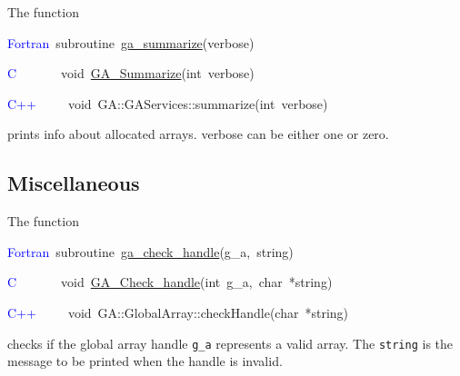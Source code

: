 The function
\begin{lyxcode}
\textcolor{blue}{Fortran}~subroutine~\href{http://www.emsl.pnl.gov/docs/global/ga_ops.html\#ga_summarize}{ga\_{}summarize}(verbose)~

\textcolor{blue}{C~}~~~~~~void~\href{http://www.emsl.pnl.gov/docs/global/c_nga_ops.html\#ga_summarize}{GA\_{}Summarize}(int~verbose)~

\textcolor{blue}{C++}~~~~~void~GA::GAServices::summarize(int~verbose)
\end{lyxcode}
prints info about allocated arrays. verbose can be either one or zero. 


\subsection{Miscellaneous }

The function
\begin{lyxcode}
\textcolor{blue}{Fortran}~subroutine~\href{http://www.emsl.pnl.gov/docs/global/ga_ops.html\#ga_check_handle}{ga\_{}check\_{}handle}(g\_a,~string)~

\textcolor{blue}{C~~}~~~~~void~\href{http://www.emsl.pnl.gov/docs/global/c_nga_ops.html\#ga_check_handle}{GA\_{}Check\_{}handle}(int~g\_a,~char~{*}string)

\textcolor{blue}{C++}~~~~~void~GA::GlobalArray::checkHandle(char~{*}string)
\end{lyxcode}
checks if the global array handle \texttt{g\_a} represents a valid
array. The \texttt{string} is the message to be printed when the handle
is invalid.
